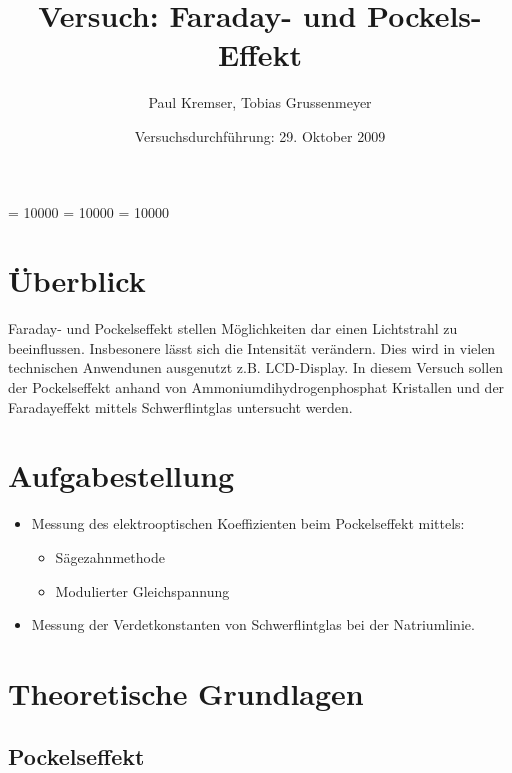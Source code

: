 \documentclass[12pt]{article}
\newcommand{\changefont}[3]{
\fontfamily{#1} \fontseries{#2} \fontshape{#3} \selectfont}
\begin{document}
\clubpenalty = 10000
\widowpenalty = 10000 
\displaywidowpenalty = 10000

\onehalfspacing
\changefont{ptm}{m}{n} 

\begin{titlepage}
\author{Paul Kremser, Tobias Grussenmeyer}
\title{Versuch: Faraday- und Pockels-Effekt}
\date{Versuchsdurchführung: 29. Oktober 2009} 
\maketitle
\thispagestyle{empty}
\end{titlepage}


\tableofcontents
\thispagestyle{empty}
\newpage
{}
\section{Überblick}
Faraday- und Pockelseffekt stellen Möglichkeiten dar einen Lichtstrahl zu beeinflussen. Insbesonere lässt sich die Intensität verändern. Dies wird in vielen technischen Anwendunen ausgenutzt z.B. LCD-Display. In diesem Versuch sollen der Pockelseffekt anhand von Ammoniumdihydrogenphosphat Kristallen und der Faradayeffekt mittels Schwerflintglas untersucht werden.

\section{Aufgabestellung}
\begin{itemize}


 \item Messung des elektrooptischen Koeffizienten beim Pockelseffekt mittels:
\begin{itemize}
 \item Sägezahnmethode
 \item Modulierter Gleichspannung
\end{itemize}

 \item Messung der Verdetkonstanten von Schwerflintglas bei der Natriumlinie.
 
\end{itemize}
\section{Theoretische Grundlagen}

\subsection{Pockelseffekt}
\end{document}
